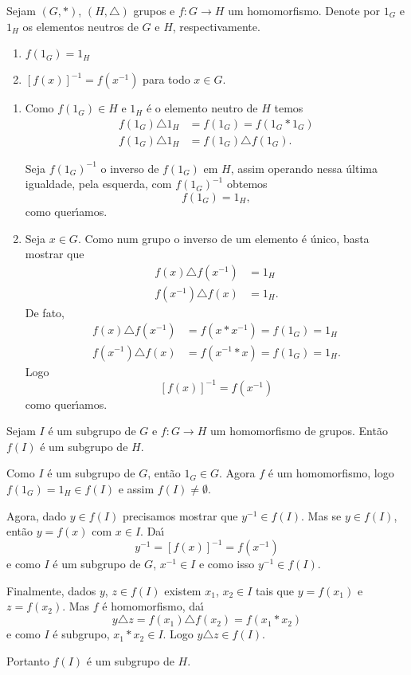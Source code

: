 \begin{proposicao}
	Sejam $(G, *)$, $(H, \triangle)$ grupos e $f : G \to H$ um homomorfismo. Denote por $1_G$ e $1_H$ os elementos neutros de $G$ e $H$, respectivamente.
	\begin{enumerate}[label={\roman*})]
		\item $f(1_G) = 1_H$
		\item $[f(x)]^{-1} = f(x^{-1})$ para todo $x \in G$.
	\end{enumerate}
\end{proposicao}
\begin{prova}
	\begin{enumerate}[label={\roman*})]
		\item Como $f(1_G) \in H$ e $1_H$ \'e o elemento neutro de $H$ temos
		\begin{align*}
			f(1_G) \triangle 1_H &= f(1_G) = f(1_G * 1_G)\\
			f(1_G) \triangle 1_H &= f(1_G) \triangle f(1_G).
		\end{align*}

		Seja $f(1_G)^{-1}$ o inverso de $f(1_G)$ em $H$, assim operando nessa \'ultima igualdade, pela esquerda, com $f(1_G)^{-1}$ obtemos
		\[
			f(1_G) = 1_H,
		\]
		como quer{\'\i}amos.

		\item Seja $x \in G$. Como num grupo o inverso de um elemento \'e \'unico, basta mostrar que
		\begin{align*}
			f(x) \triangle f(x^{-1}) &= 1_H\\
			f(x^{-1}) \triangle f(x) &= 1_H.
		\end{align*}
		De fato,
		\begin{align*}
			f(x) \triangle f(x^{-1}) &= f(x * x^{-1}) = f(1_G) = 1_H\\
			f(x^{-1}) \triangle f(x) &= f(x^{-1} * x) = f(1_G) = 1_H.
		\end{align*}
		Logo
		\[
			[f(x)]^{-1} = f(x^{-1})
		\]
		como quer{\'\i}amos.
	\end{enumerate}
\end{prova}

\begin{proposicao}
	Sejam $I$ \'e um subgrupo de $G$ e $f : G \to H$ um homomorfismo de grupos. Ent\~ao $f(I)$ \'e um subgrupo de $H$.
\end{proposicao}
\begin{prova}
	Como $I$ \'e um subgrupo de $G$, ent\~ao $1_G \in G$. Agora $f$ \'e um homomorfismo, logo $f(1_G) = 1_H \in f(I)$ e assim $f(I) \ne \emptyset$.

	Agora, dado $y \in f(I)$ precisamos mostrar que $y^{-1} \in f(I)$. Mas se $y \in f(I)$, ent\~ao $y = f(x)$ com $x \in I$. Da{\'\i}
	\[
		y^{-1} = [f(x)]^{-1} = f(x^{-1})
	\]
	e como $I$ \'e um subgrupo de $G$, $x^{-1} \in I$ e como isso $y^{-1} \in f(I)$.

	Finalmente, dados $y$, $z \in f(I)$ existem $x_1$, $x_2 \in I$ tais que $y = f(x_1)$ e $z = f(x_2)$. Mas $f$ \'e homomorfismo, da{\'\i}
	\[
		y\triangle z = f(x_1)\triangle f(x_2) = f(x_1*x_2)
	\]
	e como $I$ \'e subgrupo, $x_1*x_2 \in I$. Logo $y\triangle z \in f(I)$.

	Portanto $f(I)$ \'e um subgrupo de $H$.
\end{prova}

